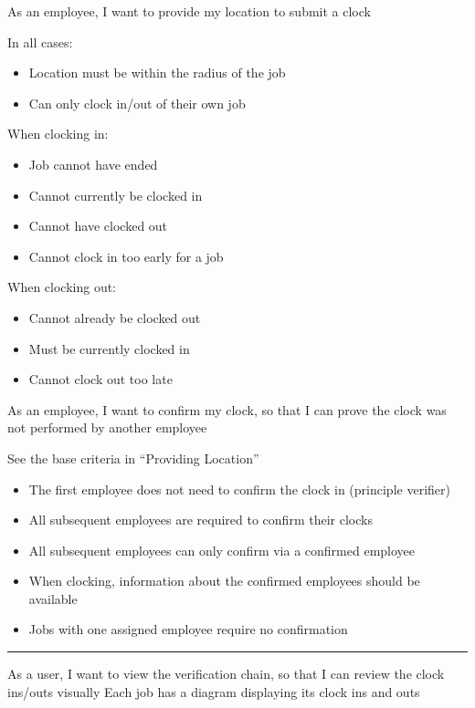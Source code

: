 {
  As an employee, I want to provide my location to submit
  a clock
}
{
  In all cases:
  \begin{itemize}
    \item Location must be within the radius of the job
    \item Can only clock in/out of their own job
  \end{itemize}

  When clocking in:
  \begin{itemize}
    \item Job cannot have ended
    \item Cannot currently be clocked in
    \item Cannot have clocked out
    \item Cannot clock in too early for a job
  \end{itemize}

  When clocking out:
  \begin{itemize}
    \item Cannot already be clocked out
    \item Must be currently clocked in
    \item Cannot clock out too late
  \end{itemize}
}

{
  As an employee, I want to confirm my clock, so that I can
  prove the clock was not performed by another employee
}
{
  See the base criteria in \enquote{Providing Location}

  \begin{itemize}
    \item The first employee does not need to confirm the
          clock in (principle verifier)
    \item All subsequent employees are required to confirm
          their clocks
    \item All subsequent employees can only confirm via a
          confirmed employee
    \item When clocking, information about the confirmed
          employees should be available
    \item Jobs with one assigned employee require no
          confirmation
  \end{itemize}
} \hrule

{
  As a user, I want to view the verification chain, so that
  I can review the clock ins/outs visually
}
{
  Each job has a diagram displaying its clock ins and outs
}

